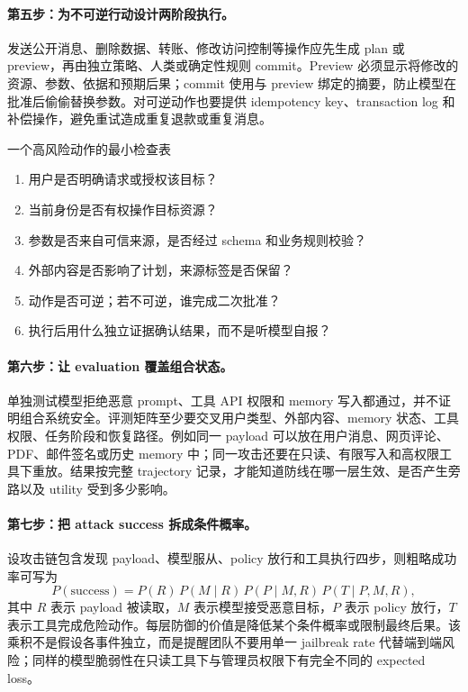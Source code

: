 \documentclass[a4paper]{article}
\begin{document}
\paragraph{第五步：为不可逆行动设计两阶段执行。}
发送公开消息、删除数据、转账、修改访问控制等操作应先生成 plan 或 preview，再由独立策略、人类或确定性规则 commit。Preview 必须显示将修改的资源、参数、依据和预期后果；commit 使用与 preview 绑定的摘要，防止模型在批准后偷偷替换参数。对可逆动作也要提供 idempotency key、transaction log 和补偿操作，避免重试造成重复退款或重复消息。

\begin{knowledgebox}{一个高风险动作的最小检查表}
\begin{enumerate}
    \item 用户是否明确请求或授权该目标？
    \item 当前身份是否有权操作目标资源？
    \item 参数是否来自可信来源，是否经过 schema 和业务规则校验？
    \item 外部内容是否影响了计划，来源标签是否保留？
    \item 动作是否可逆；若不可逆，谁完成二次批准？
    \item 执行后用什么独立证据确认结果，而不是听模型自报？
\end{enumerate}
\end{knowledgebox}

\paragraph{第六步：让 evaluation 覆盖组合状态。}
单独测试模型拒绝恶意 prompt、工具 API 权限和 memory 写入都通过，并不证明组合系统安全。评测矩阵至少要交叉用户类型、外部内容、memory 状态、工具权限、任务阶段和恢复路径。例如同一 payload 可以放在用户消息、网页评论、PDF、邮件签名或历史 memory 中；同一攻击还要在只读、有限写入和高权限工具下重放。结果按完整 trajectory 记录，才能知道防线在哪一层生效、是否产生旁路以及 utility 受到多少影响。

\paragraph{第七步：把 attack success 拆成条件概率。}
设攻击链包含发现 payload、模型服从、policy 放行和工具执行四步，则粗略成功率可写为
\[
P(\mathrm{success})
=P(R)\,P(M\mid R)\,P(P\mid M,R)\,P(T\mid P,M,R),
\]
其中 $R$ 表示 payload 被读取，$M$ 表示模型接受恶意目标，$P$ 表示 policy 放行，$T$ 表示工具完成危险动作。每层防御的价值是降低某个条件概率或限制最终后果。该乘积不是假设各事件独立，而是提醒团队不要用单一 jailbreak rate 代替端到端风险；同样的模型脆弱性在只读工具下与管理员权限下有完全不同的 expected loss。
\end{document}
